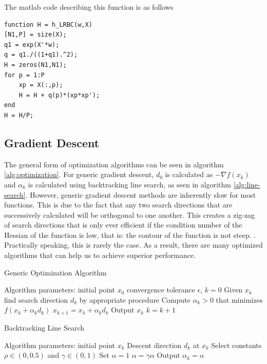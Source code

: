 \documentclass[12pt,conference]{IEEEtran}
\begin{document}
The matlab code describing this function is as follows

\vspace{0.3cm}
\begin{Verbatim}[framesep=3mm]
function H = h_LRBC(w,X)
[N1,P] = size(X);
q1 = exp(X'*w);
q = q1./((1+q1).^2);
H = zeros(N1,N1);
for p = 1:P
    xp = X(:,p);
    H = H + q(p)*(xp*xp');
end
H = H/P;
\end{Verbatim} 
\vspace{0.5cm}


\subsection {Gradient Descent}
The general form of optimization algorithms can be seen in algorithm \ref{alg:optimization}. For generic gradient descent, $d_0$ is calculated as $-\nabla f(x_k)$ and $\alpha_k$ is calculated using backtracking line search, as seen in algorithm \ref{alg:line-search}. However, generic gradient descent methods are inherently slow for most functions. This is due to the fact that any two search directions that are successively calculated will be orthogonal to one another. This creates a zig-zag of search directions that is only ever efficient if the condition number of the Hessian of the function is low, that is: the contour of the function is not steep. \cite{course-notes}. Practically speaking, this is rarely the case. As a result, there are many optimized algorithms that can help us to achieve superior performance.

\begin{algorithm}
\caption{Generic Optimization Algorithm \cite{course-notes}}
\label{alg:optimization}
\begin{algorithmic}[1]
\State Algorithm parameters: initial point $x_0$
\State convergence tolerance $\epsilon$, $k = 0$
    \State Given $x_k$ find search direction $d_k$ by appropriate procedure
    \State Compute $\alpha_k > 0$ that minimizes $f(x_k + \alpha_kd_k)$
    \State $x_{k+1} = x_k + \alpha_kd_k$
        \State Output $x_k$
    \EndIf
    \State $k = k+1$
\EndWhile 
\end{algorithmic}
\end{algorithm}

\begin{algorithm}
\caption{Backtracking Line Search \cite{course-notes}}
\label{alg:line-search}
\begin{algorithmic}[1]
\State Algorithm parameters: initial point $x_k$
\State Descent direction $d_k$ at $x_k$
\State Select constants $\rho \in (0, 0.5)$ and $\gamma \in (0,1)$
\State Set $\alpha=1$
    \State $\alpha = \gamma \alpha$
\EndWhile 
\State Output $\alpha_k = \alpha$
\end{algorithmic}
\end{algorithm}
\end{document}
